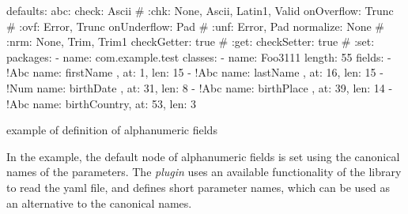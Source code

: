 \documentclass[a4paper,10pt]{report}
\newenvironment{elisting}[1][H]
  {\captionsetup{aboveskip=0pt}\begin{listing}[#1]}
  {\end{listing}%
}
\begin{document}
\begin{elisting}[!htb]
\begin{yamlcode}
defaults:
  abc:
    check: Ascii        # :chk: None, Ascii, Latin1, Valid
    onOverflow: Trunc   # :ovf: Error, Trunc
    onUnderflow: Pad    # :unf: Error, Pad
    normalize: None     # :nrm: None, Trim, Trim1
    checkGetter: true   # :get:
    checkSetter: true   # :set:
packages:
  - name: com.example.test
    classes:
      - name: Foo3111
        length: 55
        fields:
          - !Abc { name: firstName   , at:  1, len: 15 }
          - !Abc { name: lastName    , at: 16, len: 15 }
          - !Num { name: birthDate   , at: 31, len:  8 }
          - !Abc { name: birthPlace  , at: 39, len: 14 }
          - !Abc { name: birthCountry, at: 53, len:  3 }
\end{yamlcode}
\caption{example of definition of alphanumeric fields}
\label{lst:xmplAbc}
\end{elisting}

In the example, the default node of alphanumeric fields is set using the 
canonical names of the parameters. The \textit{plugin} uses an available 
functionality of the library to read the yaml file, and defines short parameter 
names, which can be used as an alternative to the canonical names.
\end{document}
